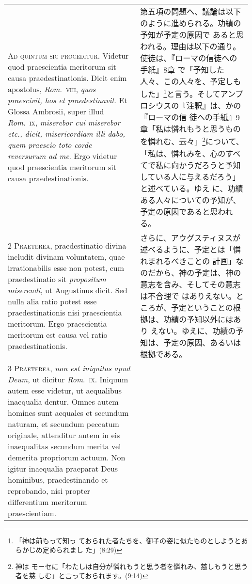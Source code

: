 \documentclass[10pt]{jsarticle} %
\begin{document}
\begin{longtable}{p{21em}p{21em}}


{\Huge A}{\scshape d quintum sic proceditur}. Videtur quod
praescientia meritorum sit causa praedestinationis. Dicit enim
apostolus, {\itshape Rom}.~{\scshape viii}, {\itshape quos praescivit, hos et praedestinavit}. Et Glossa
Ambrosii, super illud {\itshape Rom}.~{\scshape ix}, {\itshape miserebor cui miserebor etc., dicit,
misericordiam illi dabo, quem praescio toto corde reversurum ad me}. Ergo
videtur quod praescientia meritorum sit causa praedestinationis.


&

第五項の問題へ、議論は以下のように進められる。功績の予知が予定の原因で
あると思われる。理由は以下の通り。使徒は、『ローマの信徒への手紙』8章
で「予知した人々、この人々を、予定しもした」\footnote{「神は前もって知っ
ておられた者たちを、御子の姿に似たものとしようとあらかじめ定められまし
た」(8:29)}と言う。そしてアンブロシウスの『注釈』は、かの『ローマの信
徒への手紙』9章「私は憐れもうと思うものを憐れむ、云々」\footnote{神は
モーセに「わたしは自分が憐れもうと思う者を憐れみ、慈しもうと思う者を慈
しむ」と言っておられます。(9:14)}について、「私は、憐れみを、心のすべ
てで私に向かうだろうと予知している人に与えるだろう」と述べている。ゆえ
に、功績ある人々についての予知が、予定の原因であると思われる。



\\


{\scshape 2 Praeterea}, praedestinatio divina includit
divinam voluntatem, quae irrationabilis esse non potest, cum
praedestinatio sit {\itshape propositum miserendi}, ut Augustinus dicit. Sed nulla
alia ratio potest esse praedestinationis nisi praescientia
meritorum. Ergo praescientia meritorum est causa vel ratio
praedestinationis.


&

さらに、アウグスティヌスが述べるように、予定とは「憐れまれるべきことの
計画」なのだから、神の予定は、神の意志を含み、そしてその意志は不合理で
はありえない。ところが、予定ということの根拠は、功績の予知以外にはあり
えない。ゆえに、功績の予知は、予定の原因、あるいは根拠である。


\\


{\scshape 3 Praeterea}, {\itshape non est iniquitas apud Deum}, ut
dicitur {\itshape Rom}.~{\scshape ix}. Iniquum autem esse videtur, ut aequalibus inaequalia
dentur. Omnes autem homines sunt aequales et secundum naturam, et
secundum peccatum originale, attenditur autem in eis inaequalitas
secundum merita vel demerita propriorum actuum. Non igitur inaequalia
praeparat Deus hominibus, praedestinando et reprobando, nisi propter
differentium meritorum praescientiam.



\end{longtable}
\end{document}
